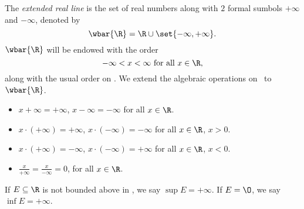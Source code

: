 \begin{definition} \label{def:extended_reals}
    The \emph{extended real line} is the set of real numbers along with $2$
    formal sumbols $+\infty$ and $-\infty$, denoted by \[
        \wbar{\R} = \R \cup \set{-\infty, +\infty}.
    \]
    $\wbar{\R}$ will be endowed with the order \[
        -\infty < x < \infty \text{ for all } x \in \R,
    \] along with the usual order on \R.
    We extend the algebraic operations on \R\ to $\wbar{\R}$.
    \begin{itemize}
        \item $x + \infty = +\infty$, $x - \infty = -\infty$ for all
            $x \in \R$.
        \item $x \cdot (+\infty) = +\infty$, $x \cdot (-\infty) = -\infty$
            for all $x \in \R$, $x > 0$.
        \item $x \cdot (+\infty) = -\infty$, $x \cdot (-\infty) = +\infty$
            for all $x \in \R$, $x < 0$.
        \item $\frac{x}{+\infty} = \frac{x}{-\infty} = 0$, for all
            $x \in \R$.
    \end{itemize}
    If $E \subseteq \R$ is not bounded above in \R, we say
    $\sup E = +\infty$.
    If $E = \O$, we say $\inf E = +\infty$.
\end{definition}

